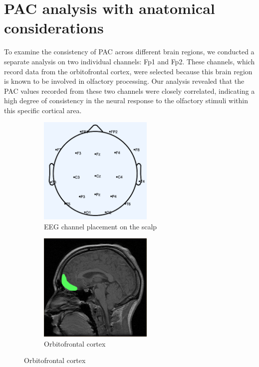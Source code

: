 \documentclass[hidelinks,12pt]{article}
\begin{document}
	\newpage
	
	\section{PAC analysis with anatomical considerations}
	To examine the consistency of PAC across different brain regions, we conducted a separate analysis on two individual channels: Fp1 and Fp2. These channels, which record data from the orbitofrontal cortex, were selected because this brain region is known to be involved in olfactory processing. Our analysis revealed that the PAC values recorded from these two channels were closely correlated, indicating a high degree of consistency in the neural response to the olfactory stimuli within this specific cortical area.
	
	\begin{figure}[h!]
		\centering
		\begin{subfigure}[b]{0.48\textwidth}
			\centering
			\includegraphics[width=0.6\textwidth]{14}
			\caption*{EEG channel placement on the scalp}
		\end{subfigure}
		\hfill
		\begin{subfigure}[b]{0.48\textwidth}
			\centering
			\includegraphics[width=0.6\textwidth]{15}
			\caption*{Orbitofrontal cortex}
		\end{subfigure}
		
	\end{figure}
	
\end{document}

